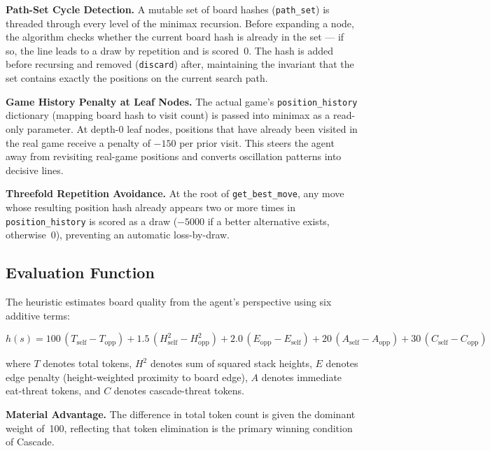 \documentclass[10.5pt,a4paper]{article}
\begin{document}
\textbf{Path-Set Cycle Detection.}
A mutable set of board hashes (\texttt{path\_set}) is threaded through every level of the minimax recursion. Before expanding a node, the algorithm checks whether the current board hash is already in the set --- if so, the line leads to a draw by repetition and is scored~0. The hash is added before recursing and removed (\texttt{discard}) after, maintaining the invariant that the set contains exactly the positions on the current search path.

\textbf{Game History Penalty at Leaf Nodes.}
The actual game's \texttt{position\_history} dictionary (mapping board hash to visit count) is passed into minimax as a read-only parameter. At depth-0 leaf nodes, positions that have already been visited in the real game receive a penalty of $-150$ per prior visit. This steers the agent away from revisiting real-game positions and converts oscillation patterns into decisive lines.

\textbf{Threefold Repetition Avoidance.}
At the root of \texttt{get\_best\_move}, any move whose resulting position hash already appears two or more times in \texttt{position\_history} is scored as a draw ($-5000$ if a better alternative exists, otherwise~0), preventing an automatic loss-by-draw.

\subsection{Evaluation Function}

The heuristic estimates board quality from the agent's perspective using six additive terms:

\begin{equation}
h(s) = 100\,(T_{\text{self}} - T_{\text{opp}})
      + 1.5\,(H^{2}_{\text{self}} - H^{2}_{\text{opp}})
      + 2.0\,(E_{\text{opp}} - E_{\text{self}})
      + 20\,(A_{\text{self}} - A_{\text{opp}})
      + 30\,(C_{\text{self}} - C_{\text{opp}})
\end{equation}

where $T$ denotes total tokens, $H^{2}$ denotes sum of squared stack heights, $E$ denotes edge penalty (height-weighted proximity to board edge), $A$ denotes immediate eat-threat tokens, and $C$ denotes cascade-threat tokens.

\textbf{Material Advantage.}
The difference in total token count is given the dominant weight of~100, reflecting that token elimination is the primary winning condition of Cascade.
\end{document}
